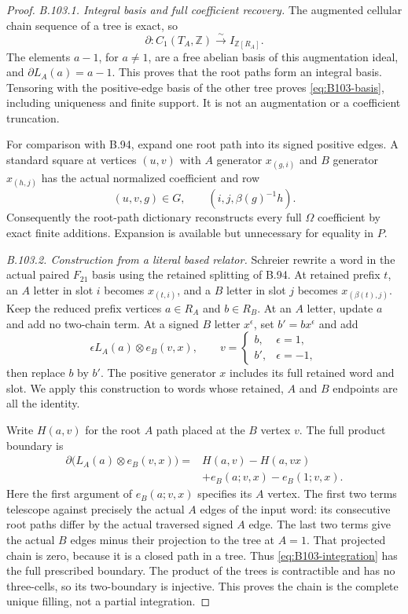 \begin{proof}
\emph{B.103.1. Integral basis and full coefficient recovery.}
The augmented cellular chain sequence of a tree is exact, so
\[
 \partial:C_1(T_A,\mathbb Z)\xrightarrow{\sim}
             I_{\mathbb Z[R_A]}.
\]
The elements $a-1$, for $a\ne1$, are a free abelian basis of this
augmentation ideal, and $\partial L_A(a)=a-1$.
This proves that the root paths form an integral basis. Tensoring
with the positive-edge basis of the other tree proves
\eqref{eq:B103-basis}, including uniqueness and finite support.
It is not an augmentation or a coefficient truncation.

For comparison with B.94, expand one root path into its signed
positive edges. A standard square at vertices $(u,v)$ with
$A$ generator $x_{(g,i)}$ and $B$ generator $x_{(h,j)}$ has the
actual normalized coefficient and row
\[
              (u,v,g)\in G,\qquad(i,j,\beta(g)^{-1}h).
\]
Consequently the root-path dictionary reconstructs every full
$\Omega$ coefficient by exact finite additions. Expansion is
available but unnecessary for equality in $P$.

\emph{B.103.2. Construction from a literal based relator.}
Schreier rewrite a word in the actual paired $F_{21}$ basis using
the retained splitting of B.94. At retained prefix $t$, an $A$
letter in slot $i$ becomes $x_{(t,i)}$, and a $B$ letter in slot
$j$ becomes $x_{(\beta(t),j)}$. Keep the reduced prefix vertices
$a\in R_A$ and $b\in R_B$.
At an $A$ letter, update $a$ and add no two-chain term.
At a signed $B$ letter $x^\epsilon$, set $b'=bx^\epsilon$ and
add
\begin{equation}\label{eq:B103-integration}
 \epsilon L_A(a)\otimes e_B(v,x),\qquad
 v=\begin{cases}b,&\epsilon=1,\\ b',&\epsilon=-1,\end{cases}
\end{equation}
then replace $b$ by $b'$.
The positive generator $x$ includes its full retained word and slot.
We apply this construction to words whose retained, $A$ and $B$
endpoints are all the identity.

Write $H(a,v)$ for the root $A$ path placed at the $B$ vertex $v$.
The full product boundary is
\begin{equation}\label{eq:B103-boundary}
 \begin{aligned}
 \partial\bigl(L_A(a)\otimes e_B(v,x)\bigr)
   ={}&H(a,v)-H(a,vx)\\
      &+e_B(a;v,x)-e_B(1;v,x).
 \end{aligned}
\end{equation}
Here the first argument of $e_B(a;v,x)$ specifies its $A$ vertex.
The first two terms telescope against precisely the actual $A$
edges of the input word: its consecutive root paths differ by
the actual traversed signed $A$ edge. The last two terms give
the actual $B$ edges minus their projection to the tree at $A=1$.
That projected chain is zero, because it is a closed path in a
tree. Thus \eqref{eq:B103-integration} has the full prescribed
boundary. The product of the trees is contractible and has no
three-cells, so its two-boundary is injective. This proves the
chain is the complete unique filling, not a partial integration.


\end{proof}
